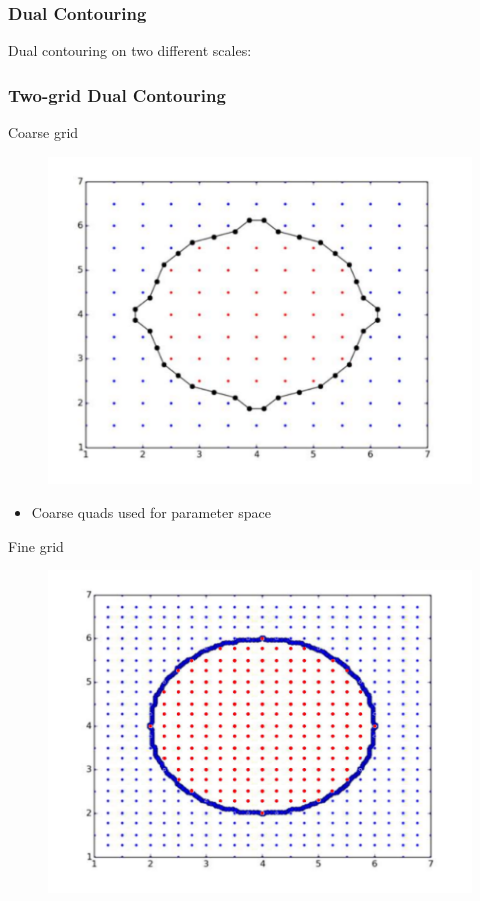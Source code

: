 \begin{frame}
	\frametitle{Dual Contouring}
	\begin{overlayarea}{\textwidth}{.25 \textheight}
	Dual contouring on two different scales:
	\frametitle{Two-grid Dual Contouring}
	\begin{overlayarea}{\textwidth}{0.9 \textheight}
	\begin{minipage}{0.45\textwidth}
	\begin{block}{\centering Coarse grid}
	\vspace{-0.5cm}
	\begin{figure}
	\includegraphics[scale=0.35]{Pictures/DC/DC_1_Coarse.pdf}
	\end{figure}
	\begin{itemize}
	\item Coarse quads used for parameter space
	\end{itemize}
	\end{block}
	\end{minipage}
	\hfill%
	\begin{minipage}{0.45\textwidth}
	\begin{block}{\centering Fine grid}
	\vspace{-0.5cm}
	\begin{figure}
	\includegraphics[scale=0.35]{Pictures/DC/DC_1_Fine.pdf}

\end{figure}
\end{block}
\end{minipage}
\end{overlayarea}
\end{overlayarea}
\end{frame}
